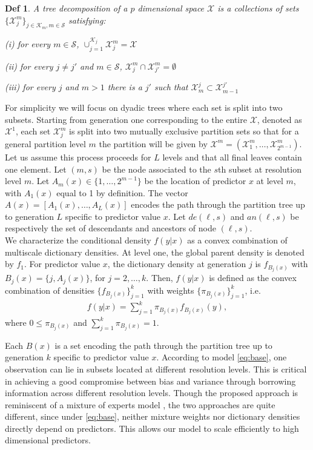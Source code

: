 \documentclass{article} %
\newtheorem{definition}[theorem]{Def}
\begin{document}
\begin{definition}\label{Def:tree} A tree decomposition of a $p$ dimensional space $\mathcal{X}$ is a collections of sets $\{\mathcal{X}^m_j\}_{j \in \mathcal{K}_m,m \in \mathcal{S}}$ satisfying:

(i) for every $m\in \mathcal{S}$, $\cup_{j=1}^{\mathcal{K}_j} \mathcal{X}^{m}_j=\mathcal{X}$ 

(ii) for every $j\not= j'$ and $m \in \mathcal{S}$, $\mathcal{X}_j^m \cap \mathcal{X}_{j'}^m=\emptyset$ 

(iii) for every $j$ and $m>1$ there is a $j'$ such that $\mathcal{X}^j_m \subset \mathcal{X}^{j'}_{m-1}$
\end{definition}

\noindent For simplicity we will focus on dyadic trees where each set is split into two subsets. Starting from generation one corresponding to the entire $\mathcal{X}$, denoted as $\mathcal{X}^1$, each set $\mathcal{X}^m_j$ is split into two mutually exclusive partition sets so that for a general partition level $m$ the partition will be given by $\mathcal{X}^{m}=\left(\mathcal{X}^{m}_1, \ldots, \mathcal{X}^{m}_{2^{m-1}}\right)$. Let us assume this process proceeds for $L$ levels and that all final leaves contain one element. Let $(m,s)$ be the node associated to the $s$th subset at resolution level $m$. Let $A_{m}(x) \in \{1, \ldots, 2^{m-1}\}$ be the location of predictor $x$ at level $m$, with $A_1(x)$ equal to 1 by definition.  The vector $A(x)=[A_1(x), \ldots, A_L(x)]$ encodes the path through the partition tree up to generation $L$ specific to predictor value $x$. Let $de(\ell,s)$ and $an(\ell,s)$ be respectively the set of descendants and ancestors of node $(\ell, s)$. \\

We characterize the conditional density $f(y|x)$ as a convex combination of multiscale dictionary densities.  At level one, the global parent density is denoted by $f_1$. For predictor value $x$, the dictionary density at generation $j$ is $f_{B_j(x)}$ with $B_j(x)=\{j,A_j(x)\}$, for $j=2,\ldots, k$. Then, $f(y|x)$ is defined as the convex combination of densities $\{f_{B_j(x)}\}_{j=1}^k$ with weights $\{\pi_{B_j(x)} \}_{j=1}^k$, i.e.
\begin{eqnarray}
f(y|x) = \sum_{j=1}^k \pi_{B_j(x)} f_{B_j(x)}(y),  \label{eq:base}
\end{eqnarray}
where $0 \le \pi_{B_j(x)}$ and $\sum_{j=1}^k \pi_{B_j(x)}=1$. 

Each $B(x)$ is a set encoding the path through the partition tree up to generation $k$ specific to predictor value $x$. According to model \eqref{eq:base}, one observation can lie in subsets located at different resolution levels. This is critical in achieving a good compromise between bias and variance through borrowing information across different resolution levels. Though the proposed approach is reminiscent of a mixture of experts model \cite{mixtureexperts}, the two approaches are quite different, since under \eqref{eq:base}, neither mixture weights nor dictionary densities directly depend on predictors. This allows our model to scale efficiently to high dimensional predictors.
\end{document}
